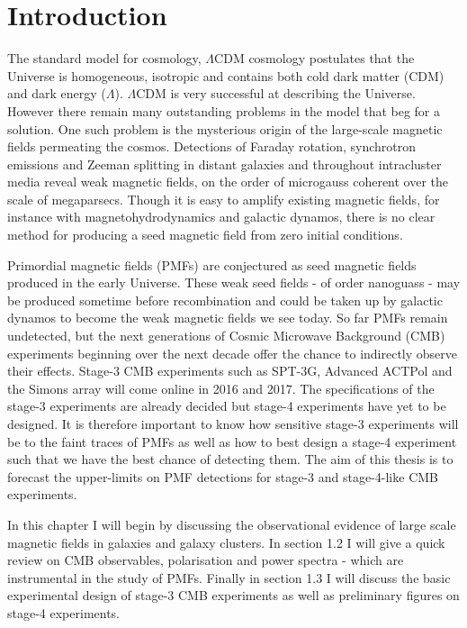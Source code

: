 \section{Introduction}

The standard model for cosmology, $\Lambda$CDM cosmology postulates that the Universe is homogeneous, isotropic and contains both cold dark matter (CDM) and dark energy ($\Lambda$). $\Lambda$CDM is very successful at describing the Universe. However there remain many outstanding problems in the model that beg for a solution. One such problem is the mysterious origin of the large-scale magnetic fields permeating the cosmos. Detections of Faraday rotation, synchrotron emissions and Zeeman splitting in distant galaxies and throughout intracluster media reveal weak magnetic fields, on the order of microgauss coherent over the scale of megaparsecs. Though it is easy to amplify existing magnetic fields, for instance with magnetohydrodynamics and galactic dynamos, there is no clear method for producing a seed magnetic field from zero initial conditions.

Primordial magnetic fields (PMFs) are conjectured as seed magnetic fields produced in the early Universe. These weak seed fields - of order nanoguass -  may be produced sometime before recombination and could be taken up by galactic dynamos to become the weak magnetic fields we see today. So far PMFs remain undetected, but the next generations of Cosmic Microwave Background (CMB) experiments beginning over the next decade offer the chance to indirectly observe their effects. Stage-3 CMB experiments such as SPT-3G, Advanced ACTPol and the Simons array will come online in 2016 and 2017. The specifications of the stage-3 experiments are already decided but stage-4 experiments have yet to be designed. It is therefore important to know how sensitive stage-3 experiments will be to the faint traces of PMFs as well as how to best design a stage-4 experiment such that we have the best chance of detecting them. The aim of this thesis is to forecast the upper-limits on PMF detections for stage-3 and stage-4-like CMB experiments.

In this chapter I will begin by discussing the observational evidence of large scale magnetic fields in galaxies and galaxy clusters. In section 1.2 I will give a quick review on CMB observables, polarisation and power spectra - which are instrumental in the study of PMFs. Finally in section 1.3 I will discuss the basic experimental design of stage-3 CMB experiments as well as preliminary figures on stage-4 experiments.

